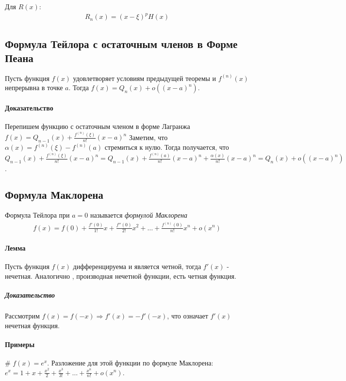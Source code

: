 \documentclass[10pt]{article}
\begin{document}
			Для $R(x)$:
			\begin{eqnarray}
				R_n(x) = (x - \xi)^pH(x)
			\end{eqnarray}
			
		\subsection{Формула Тейлора с остаточным членов в Форме Пеана}
		Пусть функция $f(x)$ удовлетворяет условиям предыдущей теоремы и $f^{(n)}(x)$ непрерывна в точке $a$. Тогда $f(x) = Q_n(x) + o((x-a)^n)$.
		
		\paragraph{Доказательство}
		Перепишем функцию с остаточным членом в форме Лагранжа $f(x) = Q_{n-1}(x) + \frac{f^{(n)}(\xi)}{n!}(x-a)^n$ Заметим, что $\alpha(x) = f^{(n)}(\xi) - f^{(n)}(a)$ стремиться к нулю. Тогда получается, что $Q_{n-1}(x) + \frac{f^{(n)}(\xi)}{n!}(x-a)^n = Q_{n-1}(x) + \frac{f^{(n)}(a)}{n!}(x-a)^n + \frac{\alpha(x)}{n!}(x-a)^n = Q_n(x) + o((x-a)^n)$.
		
		\subsection{Формула Маклорена}
		Формула Тейлора при $a = 0$ называется \textit{формулой Маклорена}
		\begin{eqnarray}
			f(x) = f(0) + \frac{f'(0)}{1!}x + \frac{f''(0)}{2!}x^2 + \dots + \frac{f^{(n)}(0)}{n!}x^n + o(x^n)
		\end{eqnarray}
		
		\paragraph{Лемма}
		Пусть функция $f(x)$ дифференцируема и является четной, тогда $f'(x)$ - нечетная. Аналогично , производная нечетной функции, есть четная функция.
		
		\subparagraph{Доказательство}
		Рассмотрим $f(x) = f(-x) \Rightarrow f'(x) = -f'(-x)$, что означает $f'(x)$ нечетная функция.
		
		\paragraph{Примеры}
		\# $f(x) = e^x$. Разложение для этой функции по формуле Маклорена: $e^x = 1 + x + \frac{x^2}{2} + \frac{x^3}{3!} + \dots + \frac{x^n}{n!} + o(x^n)$.
		
\end{document}
